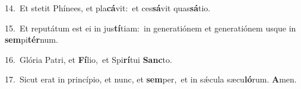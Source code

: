{\numbfont\textcolor{\numbcolor}{14.}}~Et stetit Phínees, et pla\-\textbf{cá}\-vit:~\star et ces\-\textbf{sá}\-vit quas\-\textbf{sá}\-tio.\par
{\numbfont\textcolor{\numbcolor}{15.}}~Et reputátum est ei in jus\-\textbf{tí}\-tiam:~\star in generatiónem et generatiónem usque in \textbf{sem}\-pi\-\textbf{tér}\-num.\par
{\numbfont\textcolor{\numbcolor}{16.}}~Glória Patri, et \textbf{Fí}\-lio,~\star et Spi\-\textbf{rí}\-tui \textbf{Sanc}\-to.\par
{\numbfont\textcolor{\numbcolor}{17.}}~Sicut erat in princípio, et nunc, et \textbf{sem}\-per,~\star et in sǽcula sæcu\-\textbf{ló}\-rum. \textbf{A}\-men.\par

